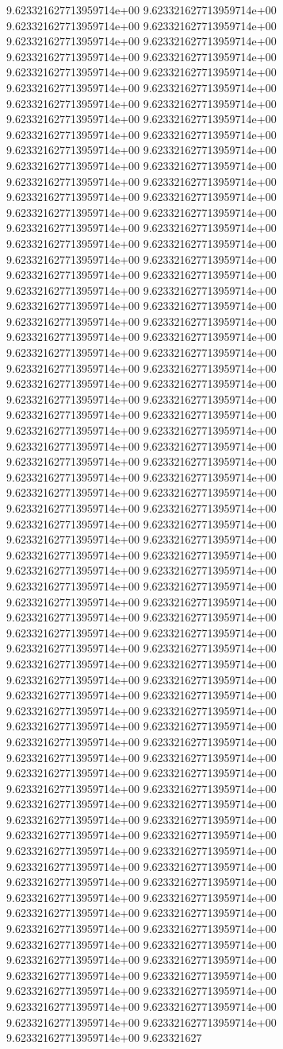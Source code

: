 9.623321627713959714e+00	9.623321627713959714e+00	9.623321627713959714e+00	9.623321627713959714e+00	9.623321627713959714e+00	9.623321627713959714e+00	9.623321627713959714e+00	9.623321627713959714e+00	9.623321627713959714e+00	9.623321627713959714e+00	9.623321627713959714e+00	9.623321627713959714e+00	9.623321627713959714e+00	9.623321627713959714e+00	9.623321627713959714e+00	9.623321627713959714e+00	9.623321627713959714e+00	9.623321627713959714e+00	9.623321627713959714e+00	9.623321627713959714e+00	9.623321627713959714e+00	9.623321627713959714e+00	9.623321627713959714e+00	9.623321627713959714e+00	9.623321627713959714e+00	9.623321627713959714e+00	9.623321627713959714e+00	9.623321627713959714e+00	9.623321627713959714e+00	9.623321627713959714e+00	9.623321627713959714e+00	9.623321627713959714e+00	9.623321627713959714e+00	9.623321627713959714e+00	9.623321627713959714e+00	9.623321627713959714e+00	9.623321627713959714e+00	9.623321627713959714e+00	9.623321627713959714e+00	9.623321627713959714e+00	9.623321627713959714e+00	9.623321627713959714e+00	9.623321627713959714e+00	9.623321627713959714e+00	9.623321627713959714e+00	9.623321627713959714e+00	9.623321627713959714e+00	9.623321627713959714e+00	9.623321627713959714e+00	9.623321627713959714e+00	9.623321627713959714e+00	9.623321627713959714e+00	9.623321627713959714e+00	9.623321627713959714e+00	9.623321627713959714e+00	9.623321627713959714e+00	9.623321627713959714e+00	9.623321627713959714e+00	9.623321627713959714e+00	9.623321627713959714e+00	9.623321627713959714e+00	9.623321627713959714e+00	9.623321627713959714e+00	9.623321627713959714e+00	9.623321627713959714e+00	9.623321627713959714e+00	9.623321627713959714e+00	9.623321627713959714e+00	9.623321627713959714e+00	9.623321627713959714e+00	9.623321627713959714e+00	9.623321627713959714e+00	9.623321627713959714e+00	9.623321627713959714e+00	9.623321627713959714e+00	9.623321627713959714e+00	9.623321627713959714e+00	9.623321627713959714e+00	9.623321627713959714e+00	9.623321627713959714e+00	9.623321627713959714e+00	9.623321627713959714e+00	9.623321627713959714e+00	9.623321627713959714e+00	9.623321627713959714e+00	9.623321627713959714e+00	9.623321627713959714e+00	9.623321627713959714e+00	9.623321627713959714e+00	9.623321627713959714e+00	9.623321627713959714e+00	9.623321627713959714e+00	9.623321627713959714e+00	9.623321627713959714e+00	9.623321627713959714e+00	9.623321627713959714e+00	9.623321627713959714e+00	9.623321627713959714e+00	9.623321627713959714e+00	9.623321627713959714e+00	9.623321627713959714e+00	9.623321627713959714e+00	9.623321627713959714e+00	9.623321627713959714e+00	9.623321627713959714e+00	9.623321627713959714e+00	9.623321627713959714e+00	9.623321627713959714e+00	9.623321627713959714e+00	9.623321627713959714e+00	9.623321627713959714e+00	9.623321627713959714e+00	9.623321627713959714e+00	9.623321627713959714e+00	9.623321627713959714e+00	9.623321627713959714e+00	9.623321627713959714e+00	9.623321627713959714e+00	9.623321627713959714e+00	9.623321627713959714e+00	9.623321627713959714e+00	9.623321627713959714e+00	9.623321627713959714e+00	9.623321627713959714e+00	9.623321627713959714e+00	9.623321627713959714e+00	9.623321627713959714e+00	9.623321627713959714e+00	9.623321627713959714e+00	9.623321627713959714e+00	9.623321627713959714e+00	9.623321627713959714e+00	9.623321627713959714e+00	9.623321627